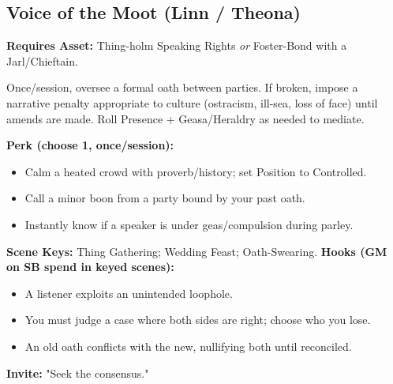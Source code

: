 \subsection{Voice of the Moot (Linn / Theona)}
\textbf{Requires Asset:} Thing-holm Speaking Rights \emph{or} Foster-Bond with a Jarl/Chieftain.
\begin{tcolorbox}[enhanced,sharp corners,boxrule=.6pt,title={Talent — Word-Bond (6 XP)}]
Once/session, oversee a formal oath between parties. If broken, impose a narrative penalty appropriate to culture (ostracism, ill-sea, loss of face) until amends are made. Roll Presence + Geasa/Heraldry as needed to mediate.
\end{tcolorbox}
\textbf{Perk (choose 1, once/session):}
\begin{itemize}
  \item Calm a heated crowd with proverb/history; set Position to Controlled.
  \item Call a minor boon from a party bound by your past oath.
  \item Instantly know if a speaker is under geas/compulsion during parley.
\end{itemize}
\textbf{Scene Keys:} Thing Gathering; Wedding Feast; Oath-Swearing.
\textbf{Hooks (GM on SB spend in keyed scenes):}
\begin{itemize}
  \item A listener exploits an unintended loophole.
  \item You must judge a case where both sides are right; choose who you lose.
  \item An old oath conflicts with the new, nullifying both until reconciled.
\end{itemize}
\textbf{Invite:} "Seek the consensus."

